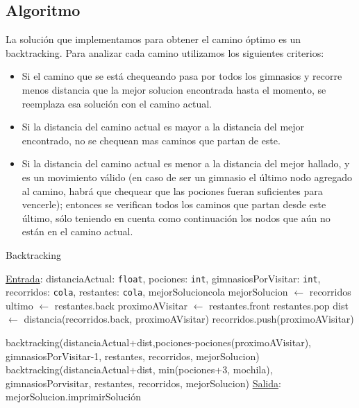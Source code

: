 \subsection{Algoritmo}

La solución que implementamos para obtener el camino óptimo es un backtracking. 
Para analizar cada camino utilizamos los siguientes criterios:
\begin{itemize}
    \item Si el camino que se está chequeando pasa por todos los gimnasios y recorre menos distancia que la mejor solucion encontrada hasta el momento, se reemplaza esa solución con el camino actual.
    \item Si la distancia del camino actual es mayor a la distancia del mejor encontrado, no se chequean mas caminos que partan de este.
    \item Si la distancia del camino actual es menor a la distancia del mejor hallado, y es un movimiento válido (en caso de ser un gimnasio el último nodo agregado al camino, habrá que chequear que las pociones fueran suficientes para vencerle); entonces se verifican todos los caminos que partan desde este último, sólo teniendo en cuenta como continuación los nodos que aún no están en el camino actual.
\end{itemize}

\begin{algorithm}[H]
\label{}
\caption{Backtracking}
\begin{algorithmic}[1]
\Statex \underline{Entrada}: distanciaActual: \texttt{float}, pociones: \texttt{int}, gimnasiosPorVisitar: \texttt{int}, recorridos: \texttt{cola}, restantes: \texttt{cola}, mejorSolucion{cola}
\medskip
{}
        \State mejorSolucion $\gets$ recorridos
    \EndIf
\Else
        \State ultimo $\gets$ restantes.back
            \State proximoAVisitar $\gets$ restantes.front
            \State restantes.pop
            \State dist $\gets$ distancia(recorridos.back, proximoAVisitar)
            \State recorridos.push(proximoAVisitar)

                \State backtracking(distanciaActual+dist,pociones-pociones(proximoAVisitar), gimnasiosPorVisitar-1, restantes, recorridos, mejorSolucion)
            \Else
                \State backtracking(distanciaActual+dist, min(pociones+3, mochila), gimnasiosPorvisitar, restantes, recorridos, mejorSolucion)
            \EndIf
        \EndWhile
    \EndIf
\EndIf
\medskip
\Statex \underline{Salida}: mejorSolucion.imprimirSoluci\'on
\end{algorithmic}
\end{algorithm}


